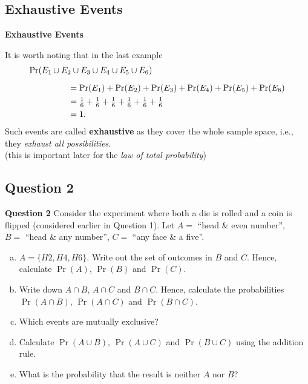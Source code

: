\documentclass[compress]{beamer}        %
\makeatletter
\newcommand{\tcb}{\textcolor{beamer@blendedblue}}
\makeatother
\begin{document}
\subsection{Exhaustive Events}
\begin{frame}{\bf \tcb{Exhaustive Events}}

It is worth noting that in the last example\\[-0.3cm]

\begin{align*}
\Pr(E_1 \cup E_2 \cup E_3 \cup E_4 \cup E_5 \cup E_6)& \\[0.2cm]
&\hspace{-3.5cm}= \Pr(E_1) + \Pr(E_2) + \Pr(E_3) + \Pr(E_4) + \Pr(E_5) + \Pr(E_6)\\
&\hspace{-3.5cm}= \tfrac{1}{6} + \tfrac{1}{6} + \tfrac{1}{6} + \tfrac{1}{6} + \tfrac{1}{6} + \tfrac{1}{6} \\
&\hspace{-3.5cm}= 1.\\
\end{align*}
Such events are called {\bf exhaustive} as they cover the whole sample space, i.e., they \emph{exhaust all possibilities}.\\[0.5cm]

{\footnotesize(this is important later for the \emph{law of total probability})}


\end{frame}



\subsection{Question 2}
\begin{frame}{\bf \tcb{Question 2}}
Consider the experiment where both a die is rolled and a coin is flipped (considered earlier in Question 1). Let $A = $ ``head \& even number'', \\$B =$ ``head \& any number'', $C =$ ``any face \& a five''.\\[0.3cm]
\begin{enumerate}[a)]\itemsep0.2cm
\item $A =\{H2,H4,H6\}$. Write out the set of outcomes in $B$ and $C$. Hence, calculate $\Pr(A)$, $\Pr(B)$ and $\Pr(C)$.
\item Write down $A \cap B$, $A \cap C$ and $B \cap C$. Hence, calculate the probabilities $\Pr(A \cap B)$, $\Pr(A \cap C)$ and $\Pr(B \cap C)$.
\item Which events are mutually exclusive?
\item Calculate $\Pr(A \cup B)$, $\Pr(A \cup C)$ and $\Pr(B \cup C)$ using the addition rule. %
\item What is the probability that the result is neither $A$ nor $B$?
\end{enumerate}

\end{frame}
\end{document}
